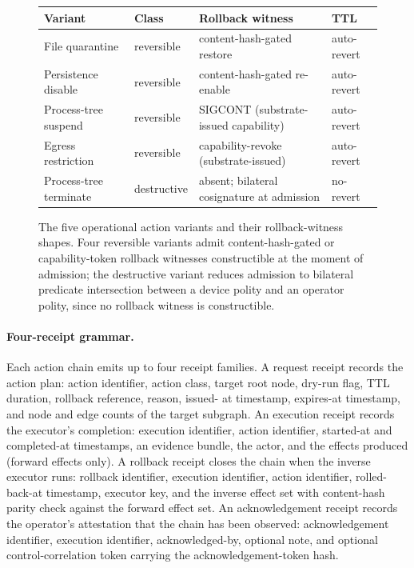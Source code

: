 \begin{figure}[t]
\centering
\small
\begin{tabularx}{\linewidth}{@{}l l X l@{}}
\toprule
\textbf{Variant} & \textbf{Class} & \textbf{Rollback witness} & \textbf{TTL} \\
\midrule
File quarantine        & reversible  & content-hash-gated restore                       & auto-revert \\
Persistence disable    & reversible  & content-hash-gated re-enable                     & auto-revert \\
Process-tree suspend   & reversible  & SIGCONT (substrate-issued capability)            & auto-revert \\
Egress restriction     & reversible  & capability-revoke (substrate-issued)             & auto-revert \\
Process-tree terminate & destructive & absent; bilateral cosignature at admission       & no-revert   \\
\bottomrule
\end{tabularx}
\caption{The five operational action variants and their rollback-witness
shapes. Four reversible variants admit content-hash-gated or
capability-token rollback witnesses constructible at the moment of
admission; the destructive variant reduces admission to bilateral
predicate intersection between a device polity and an operator polity,
since no rollback witness is constructible.}
\label{fig:variants}
\end{figure}

\paragraph{Four-receipt grammar.}
Each action chain emits up to four receipt families. A request receipt
records the action plan: action identifier, action class, target root
node, dry-run flag, TTL duration, rollback reference, reason, issued-
at timestamp, expires-at timestamp, and node and edge counts of the
target subgraph. An execution receipt records the executor's
completion: execution identifier, action identifier, started-at and
completed-at timestamps, an evidence bundle, the actor, and the
effects produced (forward effects only). A rollback receipt closes the
chain when the inverse executor runs: rollback identifier, execution
identifier, action identifier, rolled-back-at timestamp, executor key,
and the inverse effect set with content-hash parity check against the
forward effect set. An acknowledgement receipt records the operator's
attestation that the chain has been observed: acknowledgement
identifier, execution identifier, acknowledged-by, optional note, and
optional control-correlation token carrying the acknowledgement-token
hash.

